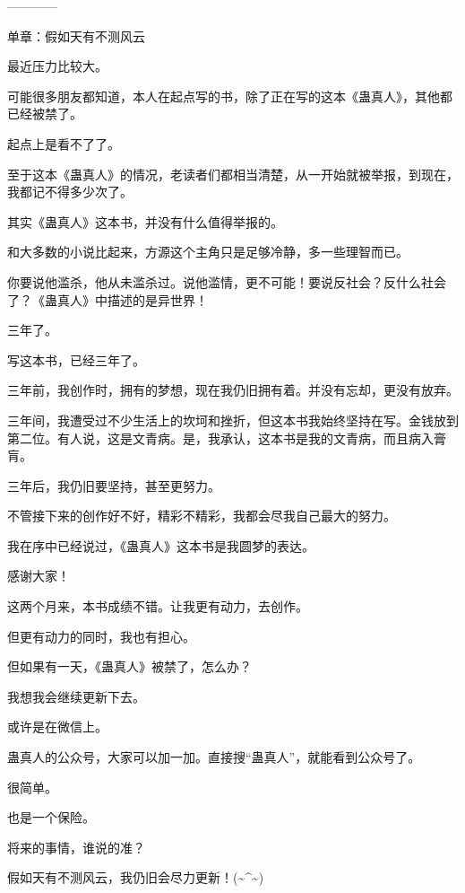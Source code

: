 \begin{this_body}
------------

单章：假如天有不测风云

最近压力比较大。

可能很多朋友都知道，本人在起点写的书，除了正在写的这本《蛊真人》，其他都已经被禁了。

起点上是看不了了。

至于这本《蛊真人》的情况，老读者们都相当清楚，从一开始就被举报，到现在，我都记不得多少次了。

其实《蛊真人》这本书，并没有什么值得举报的。

和大多数的小说比起来，方源这个主角只是足够冷静，多一些理智而已。

你要说他滥杀，他从未滥杀过。说他滥情，更不可能！要说反社会？反什么社会了？《蛊真人》中描述的是异世界！

三年了。

写这本书，已经三年了。

三年前，我创作时，拥有的梦想，现在我仍旧拥有着。并没有忘却，更没有放弃。

三年间，我遭受过不少生活上的坎坷和挫折，但这本书我始终坚持在写。金钱放到第二位。有人说，这是文青病。是，我承认，这本书是我的文青病，而且病入膏肓。

三年后，我仍旧要坚持，甚至更努力。

不管接下来的创作好不好，精彩不精彩，我都会尽我自己最大的努力。

我在序中已经说过，《蛊真人》这本书是我圆梦的表达。

感谢大家！

这两个月来，本书成绩不错。让我更有动力，去创作。

但更有动力的同时，我也有担心。

但如果有一天，《蛊真人》被禁了，怎么办？

我想我会继续更新下去。

或许是在微信上。

蛊真人的公众号，大家可以加一加。直接搜“蛊真人”，就能看到公众号了。

很简单。

也是一个保险。

将来的事情，谁说的准？

假如天有不测风云，我仍旧会尽力更新！(\~{}\^{}\~{})

\end{this_body}

